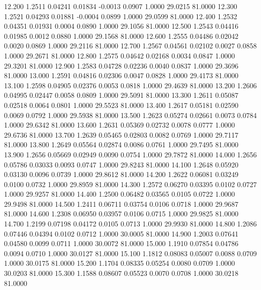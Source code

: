   12.200   1.2511   0.04241   0.01834  -0.0013   0.0907   1.0000  29.0215  81.0000
  12.300   1.2521   0.04293   0.01881  -0.0004   0.0899   1.0000  29.0599  81.0000
  12.400   1.2532   0.04351   0.01931   0.0004   0.0890   1.0000  29.1056  81.0000
  12.500   1.2543   0.04416   0.01985   0.0012   0.0880   1.0000  29.1568  81.0000
  12.600   1.2555   0.04486   0.02042   0.0020   0.0869   1.0000  29.2116  81.0000
  12.700   1.2567   0.04561   0.02102   0.0027   0.0858   1.0000  29.2671  81.0000
  12.800   1.2575   0.04642   0.02168   0.0034   0.0847   1.0000  29.3201  81.0000
  12.900   1.2583   0.04728   0.02236   0.0040   0.0837   1.0000  29.3696  81.0000
  13.000   1.2591   0.04816   0.02306   0.0047   0.0828   1.0000  29.4173  81.0000
  13.100   1.2598   0.04905   0.02376   0.0053   0.0818   1.0000  29.4639  81.0000
  13.200   1.2606   0.04995   0.02447   0.0058   0.0809   1.0000  29.5091  81.0000
  13.300   1.2611   0.05087   0.02518   0.0064   0.0801   1.0000  29.5523  81.0000
  13.400   1.2617   0.05181   0.02590   0.0069   0.0792   1.0000  29.5938  81.0000
  13.500   1.2623   0.05274   0.02661   0.0073   0.0784   1.0000  29.6342  81.0000
  13.600   1.2631   0.05369   0.02732   0.0078   0.0777   1.0000  29.6736  81.0000
  13.700   1.2639   0.05465   0.02803   0.0082   0.0769   1.0000  29.7117  81.0000
  13.800   1.2649   0.05564   0.02874   0.0086   0.0761   1.0000  29.7495  81.0000
  13.900   1.2656   0.05669   0.02949   0.0090   0.0754   1.0000  29.7872  81.0000
  14.000   1.2656   0.05786   0.03033   0.0093   0.0747   1.0000  29.8243  81.0000
  14.100   1.2648   0.05920   0.03130   0.0096   0.0739   1.0000  29.8612  81.0000
  14.200   1.2622   0.06081   0.03249   0.0100   0.0732   1.0000  29.8959  81.0000
  14.300   1.2572   0.06270   0.03395   0.0102   0.0727   1.0000  29.9257  81.0000
  14.400   1.2500   0.06482   0.03565   0.0105   0.0722   1.0000  29.9498  81.0000
  14.500   1.2411   0.06711   0.03754   0.0106   0.0718   1.0000  29.9687  81.0000
  14.600   1.2308   0.06950   0.03957   0.0106   0.0715   1.0000  29.9825  81.0000
  14.700   1.2199   0.07198   0.04172   0.0105   0.0713   1.0000  29.9930  81.0000
  14.800   1.2086   0.07446   0.04394   0.0102   0.0712   1.0000  30.0005  81.0000
  14.900   1.2003   0.07641   0.04580   0.0099   0.0711   1.0000  30.0072  81.0000
  15.000   1.1910   0.07854   0.04786   0.0094   0.0710   1.0000  30.0127  81.0000
  15.100   1.1812   0.08083   0.05007   0.0088   0.0709   1.0000  30.0175  81.0000
  15.200   1.1704   0.08335   0.05254   0.0080   0.0709   1.0000  30.0203  81.0000
  15.300   1.1588   0.08607   0.05523   0.0070   0.0708   1.0000  30.0218  81.0000
